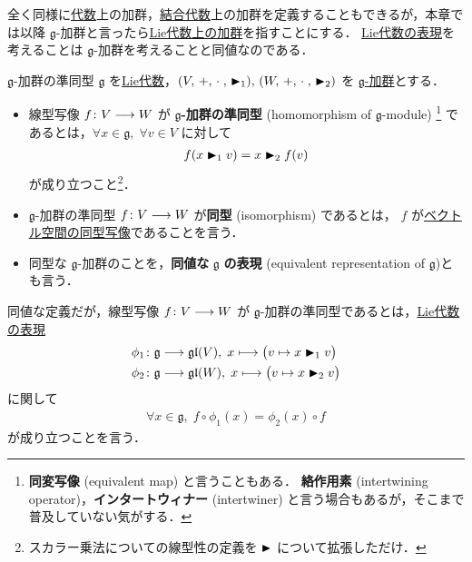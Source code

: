 \documentclass[rep_main]{subfiles}
\begin{document}
全く同様に\hyperref[def:Alg]{代数}上の加群，\hyperref[def:Alg]{結合代数}上の加群を定義することもできるが，本章では以降 $\mathfrak{g}$-加群と言ったら\hyperref[ax:g-module]{Lie代数上の加群}を指すことにする．
\hyperref[def:rep-LieAlg]{Lie代数の表現}を考えることは $\mathfrak{g}$-加群を考えることと同値なのである．

\begin{mydef}[label=def:g-module-hom]{$\mathfrak{g}$-加群の準同型}
    $\mathfrak{g}$ を\hyperref[ax:LieAlg]{Lie代数}，$(V,\, +,\, \cdot\;,\, \blacktriangleright_1),\, (W,\, +,\, \cdot\;,\, \blacktriangleright_2)$ を \hyperref[ax:g-module]{ $\mathfrak{g}$-加群}とする．
    \begin{itemize}
		\item 線型写像 $f \colon V \longrightarrow W$ が $\bm{\mathfrak{g}}$\textbf{-加群の準同型} (homomorphism of $\mathfrak{g}$-module)
		\footnote{
			\textbf{同変写像} (equivalent map) と言うこともある．
			\textbf{絡作用素} (intertwining operator)，\textbf{インタートウィナー} (intertwiner) と言う場合もあるが，そこまで普及していない気がする．
		} であるとは，$\forall x \in \mathfrak{g},\; \forall v \in V$ に対して
		\begin{align}
			f(x \blacktriangleright_1 v) = x \blacktriangleright_2 f(v)
		\end{align}
		が成り立つこと\footnote{スカラー乗法についての線型性の定義を $\blacktriangleright$ について拡張しただけ．}．	
        \item $\mathfrak{g}$-加群の準同型 $f \colon V \longrightarrow W$ が\textbf{同型} (isomorphism) であるとは，
        $f$ が\underline{ベクトル空間の同型写像}であることを言う．
        \item 同型な $\mathfrak{g}$-加群のことを，\textbf{同値な} $\bm{\mathfrak{g}}$ \textbf{の表現} (equivalent representation of $\mathfrak{g}$)とも言う．
    \end{itemize}

    \tcblower

	同値な定義だが，線型写像 $f \colon V \longrightarrow W$ が $\mathfrak{g}$-加群の準同型であるとは，\hyperref[def:rep-LieAlg]{Lie代数の表現}
	\begin{align}
		\phi_1 \colon \mathfrak{g} &\longrightarrow \mathfrak{gl} (V),\; x \longmapsto \bigl( v \mapsto x \blacktriangleright_1 v \bigr) \\
		\phi_2 \colon \mathfrak{g} &\longrightarrow \mathfrak{gl} (W),\; x \longmapsto \bigl( v \mapsto x \blacktriangleright_2 v \bigr) 
	\end{align}
	に関して
	\begin{align}
		\forall x \in \mathfrak{g},\; f \circ \phi_1(x) = \phi_2(x) \circ f
	\end{align}
	が成り立つことを言う．
\end{mydef}
\end{document}
